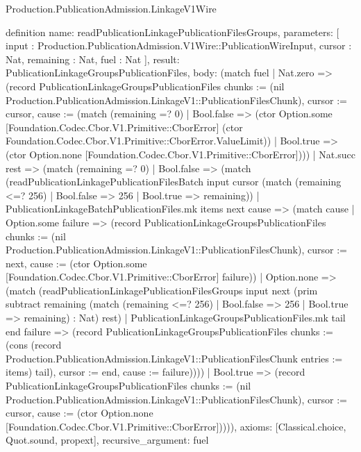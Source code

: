 \begin{lexlean}{Production.PublicationAdmission.LinkageV1Wire}
\begin{semanticmodule}
definition{
  name: readPublicationLinkagePublicationFilesGroups,
  parameters: [
    input : Production.PublicationAdmission.V1Wire::PublicationWireInput,
    cursor : Nat,
    remaining : Nat,
    fuel : Nat
  ],
  result: PublicationLinkageGroupsPublicationFiles,
  body: (match fuel
    | Nat.zero => (record PublicationLinkageGroupsPublicationFiles {chunks := (nil Production.PublicationAdmission.LinkageV1::PublicationFilesChunk), cursor := cursor, cause := (match (remaining =? 0)
      | Bool.false => (ctor Option.some [Foundation.Codec.Cbor.V1.Primitive::CborError] (ctor Foundation.Codec.Cbor.V1.Primitive::CborError.ValueLimit))
      | Bool.true => (ctor Option.none [Foundation.Codec.Cbor.V1.Primitive::CborError]))})
    | Nat.succ rest => (match (remaining =? 0)
      | Bool.false => (match (readPublicationLinkagePublicationFilesBatch input cursor (match (remaining <=? 256)
          | Bool.false => 256
          | Bool.true => remaining))
        | PublicationLinkageBatchPublicationFiles.mk items next cause => (match cause
          | Option.some failure => (record PublicationLinkageGroupsPublicationFiles {chunks := (nil Production.PublicationAdmission.LinkageV1::PublicationFilesChunk), cursor := next, cause := (ctor Option.some [Foundation.Codec.Cbor.V1.Primitive::CborError] failure)})
          | Option.none => (match (readPublicationLinkagePublicationFilesGroups input next (prim subtract remaining (match (remaining <=? 256)
              | Bool.false => 256
              | Bool.true => remaining) : Nat) rest)
            | PublicationLinkageGroupsPublicationFiles.mk tail end failure => (record PublicationLinkageGroupsPublicationFiles {chunks := (cons (record Production.PublicationAdmission.LinkageV1::PublicationFilesChunk {entries := items}) tail), cursor := end, cause := failure}))))
      | Bool.true => (record PublicationLinkageGroupsPublicationFiles {chunks := (nil Production.PublicationAdmission.LinkageV1::PublicationFilesChunk), cursor := cursor, cause := (ctor Option.none [Foundation.Codec.Cbor.V1.Primitive::CborError])}))),
  axioms: [Classical.choice, Quot.sound, propext],
  recursive_argument: fuel
}


\end{semanticmodule}
\end{lexlean}
